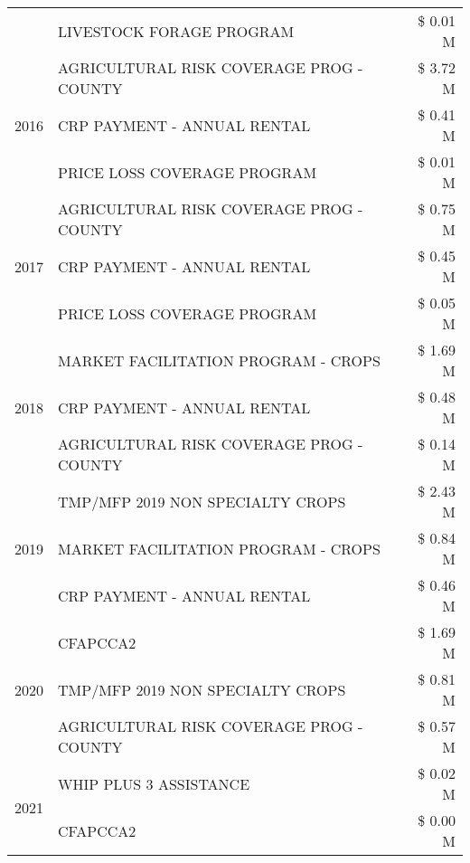\begin{tabular}{llr}
 & LIVESTOCK FORAGE PROGRAM & \$ 0.01 M \\
\cline{1-3}
\multirow[t]{3}{*}{2016} & AGRICULTURAL RISK COVERAGE PROG - COUNTY      & \$ 3.72 M \\
 & CRP PAYMENT - ANNUAL RENTAL                   & \$ 0.41 M \\
 & PRICE LOSS COVERAGE PROGRAM                   & \$ 0.01 M \\
\cline{1-3}
\multirow[t]{3}{*}{2017} & AGRICULTURAL RISK COVERAGE PROG - COUNTY & \$ 0.75 M \\
 & CRP PAYMENT - ANNUAL RENTAL & \$ 0.45 M \\
 & PRICE LOSS COVERAGE PROGRAM & \$ 0.05 M \\
\cline{1-3}
\multirow[t]{3}{*}{2018} & MARKET FACILITATION PROGRAM - CROPS & \$ 1.69 M \\
 & CRP PAYMENT - ANNUAL RENTAL & \$ 0.48 M \\
 & AGRICULTURAL RISK COVERAGE PROG - COUNTY & \$ 0.14 M \\
\cline{1-3}
\multirow[t]{3}{*}{2019} & TMP/MFP 2019 NON SPECIALTY CROPS & \$ 2.43 M \\
 & MARKET FACILITATION PROGRAM - CROPS & \$ 0.84 M \\
 & CRP PAYMENT - ANNUAL RENTAL & \$ 0.46 M \\
\cline{1-3}
\multirow[t]{3}{*}{2020} & CFAPCCA2 & \$ 1.69 M \\
 & TMP/MFP 2019 NON SPECIALTY CROPS & \$ 0.81 M \\
 & AGRICULTURAL RISK COVERAGE PROG - COUNTY & \$ 0.57 M \\
\cline{1-3}
\multirow[t]{2}{*}{2021} & WHIP PLUS 3 ASSISTANCE & \$ 0.02 M \\
 & CFAPCCA2 & \$ 0.00 M \\
\cline{1-3}
\bottomrule
\end{tabular}
